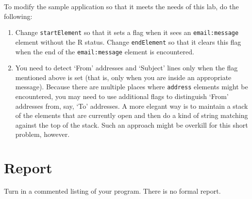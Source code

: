 \documentclass[twocolumn]{article}
\begin{document}
To modify the sample application so that it meets the needs of this lab, do the following:
\begin{enumerate}

\item Change \texttt{startElement} so that it sets a flag when it sees an \texttt{email:message}
  element without the R status. Change \texttt{endElement} so that it clears this flag when the
  end of the \texttt{email:message} element is encountered.

\item You need to detect `From' addresses and `Subject' lines only when the flag mentioned above
  is set (that is, only when you are inside an appropriate message). Because there are multiple
  places where \texttt{address} elements might be encountered, you may need to use additional
  flags to distinguish `From' addresses from, say, `To' addresses. A more elegant way is to
  maintain a stack of the elements that are currently open and then do a kind of string matching
  against the top of the stack. Such an approach might be overkill for this short problem,
  however.
\end{enumerate}

\section{Report}

Turn in a commented listing of your program. There is no formal report.
\end{document}
